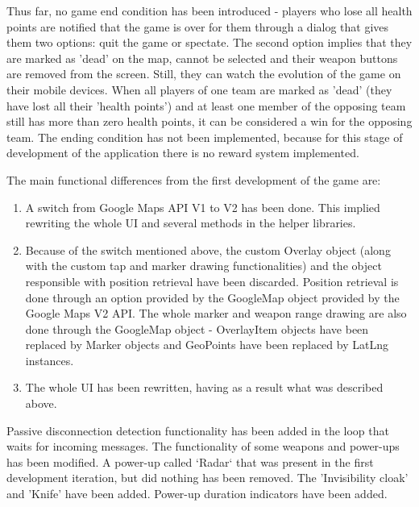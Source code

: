 Thus far, no game end condition has been introduced - players who lose all
health points are notified that the game is over for them through a dialog that
gives them two options: quit the game or spectate. The second option implies
that they are marked as 'dead' on the map, cannot be selected and their weapon
buttons are removed from the screen. Still, they can watch the evolution of the
game on their mobile devices. When all players of one team are marked as 'dead'
(they have lost all their 'health points') and at least one member of the
opposing team still has more than zero health points, it can be considered a win
for the opposing team. The ending condition has not been implemented, because
for this stage of development of the application there is no reward system
implemented. \newline

The main functional differences from the first development of the game are:

\begin{enumerate}
  \item A switch from Google Maps API V1 to V2 has been done. This implied
  rewriting the whole UI and several methods in the helper libraries.
  
  \item Because of the switch mentioned above, the custom Overlay object (along
  with the custom tap and marker drawing functionalities) and the object
  responsible with position retrieval have been discarded. Position retrieval is
  done through an option provided by the GoogleMap object provided by the Google
  Maps V2 API. The whole marker and weapon range drawing are also done through
  the GoogleMap object - OverlayItem objects have been replaced by Marker
  objects and GeoPoints have been replaced by LatLng instances.
  
  \item The whole UI has been rewritten, having as a result what was described
  above.  
  
\end{enumerate}

Passive disconnection detection functionality has been added in the loop that
waits for incoming messages. The functionality of some weapons and power-ups has
been modified. A power-up called `Radar` that was present in the first
development iteration, but did nothing has been removed. The 'Invisibility
cloak' and 'Knife' have been added. Power-up duration indicators have been
added.\newline

